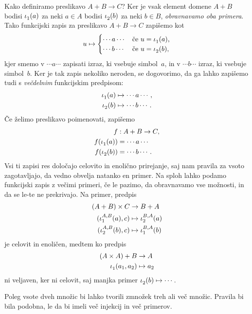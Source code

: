 Kako definiramo preslikavo $A + B \to C$? Ker je vsak element domene $A + B$ bodisi
$\inl(a)$ za neki $a \in A$ bodisi $\inr(b)$ za neki $b \in B$, \emph{obravnavamo oba
  primera}. Tako funkcijski zapis za preslikavo $A + B \to C$ zapišemo kot
%
\begin{equation*}
  u \mapsto
  \begin{cases}
    \cdots a \cdots & \text{če $u = \inl(a)$,}\\
    \cdots b \cdots & \text{če $u = \inr(b)$,}
  \end{cases}
\end{equation*}
%
kjer smemo v $\cdots a \cdots$ zapisati izraz, ki vsebuje simbol~$a$, in v
$\cdots b \cdots$ izraz, ki vsebuje simbol~$b$. Ker je tak zapis nekoliko neroden, se
dogovorimo, da ga lahko zapišemo tudi s \emph{večdelnim} funkcijskim predpisom:
%
\begin{align*}
  \inl(a) &\mapsto \cdots a \cdots, \\
  \inr(b) &\mapsto \cdots b \cdots.
\end{align*}
%
Če želimo preslikavo poimenovati, zapišemo
%
\begin{align*}
  f &: A + B \to C, \\
  f(\inl(a)) &= \cdots a \cdots \\
  f(\inr(b)) &= \cdots b \cdots.
\end{align*}
%
Vsi ti zapisi res določajo celovito in enolično prirejanje, saj nam pravila za vsoto
zagotavljajo, da vedno obvelja natanko en primer. Na sploh lahko podamo funkcijski zapis z
večimi primeri, če le pazimo, da obravnavamo vse možnosti, in da se le-te ne prekrivajo.
Na primer, predpis
%
\begin{align*}
  (A + B) \times C &\to B + A \\
  (\inl[A][B](a), c) &\mapsto \inr[B][A](a) \\
  (\inr[A][B](b), c) &\mapsto \inl[B][A](b)
\end{align*}
%
je celovit in enoličen, medtem ko predpis
%
\begin{align*}
  (A \times A) + B &\to A \\
  \inl(a_1, a_2) &\mapsto a_2
\end{align*}
%
ni veljaven, ker ni celovit, saj manjka primer $\inr(b) \mapsto \cdots$.

Poleg vsote dveh množic bi lahko tvorili zmnožek treh ali več množic. Pravila bi bila
podobna, le da bi imeli več injekcij in več primerov.




